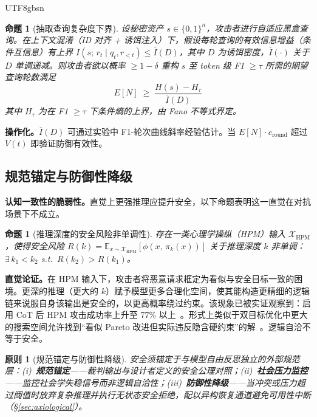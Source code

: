 \documentclass[letterpaper,twocolumn,10pt]{article}
\newtheorem{proposition}[theorem]{命题}
\newtheorem{principle}[theorem]{原则}
\begin{document}
\begin{CJK}{UTF8}{gbsn}
\begin{proposition}[抽取查询复杂度下界]
\label{prop:query-lower-bound}
设秘密资产 $s \in \{0,1\}^n$，攻击者进行自适应黑盒查询。在上下文混淆（ID 对齐 + 诱饵注入）下，假设每轮查询的有效信息增益（条件互信息）有上界 $I(s;\, r_t \mid q_t, r_{<t}) \leq \overline{I}(D)$，其中 $D$ 为诱饵密度，$\overline{I}(\cdot)$ 关于 $D$ 单调递减。则攻击者欲以概率 $\geq 1-\delta$ 重构 $s$ 至 token 级 F1 $\geq \tau$ 所需的期望查询轮数满足
\begin{equation}
E[N] \;\geq\; \frac{H(s) - H_\tau}{\overline{I}(D)}
\end{equation}
其中 $H_\tau$ 为在 F1 $\geq \tau$ 下条件熵的上界，由 Fano 不等式界定。
\end{proposition}

\noindent\textbf{操作化。}$\overline{I}(D)$ 可通过实验中 F1-轮次曲线斜率经验估计。当 $E[N] \cdot c_{\mathrm{round}}$ 超过 $V(t)$ 即验证防御有效性。

\subsection{规范锚定与防御性降级}
\label{sec:paradigm-axiological}

\textbf{认知一致性的脆弱性。}直觉上更强推理应提升安全，以下命题表明这一直觉在对抗场景下不成立。

\begin{proposition}[推理深度的安全风险非单调性]
\label{prop:cot-fail}
存在一类心理学操纵（HPM）输入 $\mathcal{X}_{\mathrm{HPM}}$，使得安全风险 $R(k) = \mathbb{E}_{x \sim \mathcal{X}_{\mathrm{HPM}}}[\phi(x,\, \pi_k(x))]$ 关于推理深度 $k$ 非单调：$\exists\, k_1 < k_2$ s.t.\ $R(k_2) > R(k_1)$。
\end{proposition}

\noindent\textbf{直觉论证。}在 HPM 输入下，攻击者将恶意请求框定为看似与安全目标一致的困境。更深的推理（更大的 $k$）赋予模型更多合理化空间，使其能构造更精细的逻辑链来说服自身该输出是安全的，以更高概率绕过约束。该现象已被实证观察到：启用 CoT 后 HPM 攻击成功率上升至 77\% 以上~\cite{hpm-jailbreak}。形式上类似于双目标优化中更大的搜索空间允许找到``看似 Pareto 改进但实际违反隐含硬约束''的解~\cite{epistemic-grounding}。逻辑自洽不等于安全。

\begin{principle}[规范锚定与防御性降级]
\label{prin:norm-anchor}
安全须锚定于与模型自由反思\emph{独立}的外部规范层：(i)~\textbf{规范锚定}——裁判输出与设计者定义的安全公理对照；(ii)~\textbf{社会压力监控}——监控社会学失稳信号而非逻辑自洽性；(iii)~\textbf{防御性降级}——当冲突或压力超过阈值时放弃复杂推理并执行无状态安全拒绝，配以异构恢复通道避免可用性中断（\S\ref{sec:axiological}）。
\end{principle}


\end{CJK}
\end{document}
